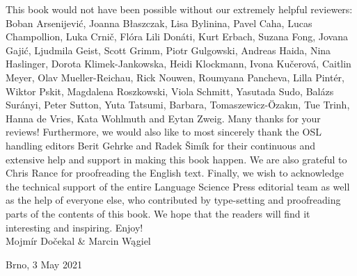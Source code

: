 \documentclass{langscibook}
\begin{document}
This book would not have been possible without our extremely helpful reviewers: Boban Arsenijević, Joanna Błaszczak, Lisa Bylinina, Pavel Caha, Lucas Champollion, Luka Crnič, Flóra Lili Donáti, Kurt Erbach, Suzana Fong, Jovana Gajić, Ljudmila Geist, Scott Grimm, Piotr Gulgowski, Andreas Haida, Nina Haslinger, Dorota Klimek-Jankowska, Heidi Klockmann, Ivona Kučerová, Caitlin Meyer, Olav Mueller-Reichau, Rick Nouwen, Roumyana Pancheva, Lilla Pintér, Wiktor Pskit, Magdalena Roszkowski, Viola Schmitt, Yasutada Sudo, Balázs Surányi, Peter Sutton, Yuta Tatsumi, Barbara, Tomaszewicz-Özakın, Tue Trinh, Hanna de Vries, Kata Wohlmuth and Eytan Zweig. Many thanks for your reviews! Furthermore, we would also like to most sincerely thank the OSL handling editors Berit Gehrke and Radek Šimík for their continuous and extensive help and support in making this book happen. We are also grateful to Chris Rance for proofreading the English text. Finally, we wish to acknowledge the technical support of the entire Language Science Press editorial team as well as the help of everyone else, who contributed by type-setting and proofreading parts of the contents of this book. We hope that the readers will find it interesting and inspiring. Enjoy!\bigskip\\

\hfill Mojmír Dočekal \& Marcin Wągiel

\hfill Brno, 3 May 2021

{\sloppy\printbibliography[heading=subbibliography,notkeyword=this]}
\end{document}
